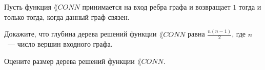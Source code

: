 Пусть функция $\lang{CONN}$ принимается на вход ребра графа и возвращает $1$ тогда и только тогда, когда данный граф
связен. 
\begin{enumcyr}
    \item Докажите, что глубина дерева решений функции $\lang{CONN}$ равна $\frac{n (n - 1)}{2}$, где $n$~--- число вершин
	    входного графа.
    \item Оцените размер дерева решений функции $\lang{CONN}$.
\end{enumcyr}